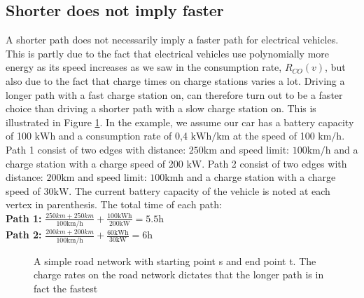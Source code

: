 \subsection{Shorter does not imply faster}
\label{sec:shorternotfaster}

A shorter path does not necessarily imply a faster path for electrical vehicles. This is partly due to the fact that electrical vehicles use polynomially more energy as its speed increases as we saw in the consumption rate, $R_{CO}(v)$, but also due to the fact that charge times on charge stations varies a lot. Driving a longer path with a fast charge station on, can therefore turn out to be a faster choice than driving a shorter path with a slow charge station on. This is illustrated in Figure \ref{fig:simpleroad-network}. In the example, we assume our car has a battery capacity of 100 $\si{\kWh}$ and a consumption rate of 0,4 $\si{\kWh\per\km}$ at the speed of 100 $\si{\km\per\hour}$.\\

Path 1 consist of two edges with distance: $ 250 \si{\km}$ and speed limit: $100 \si{\km\per\hour}$
and a charge station with a charge speed of 200 $\si{\kW}$. Path 2 consist of two edges with distance: $200 \si{\km}$ and speed limit: $100 \si{\km\hour}$ and a charge station with a charge speed of $30\si{\kW}$. The current battery capacity of the vehicle is noted at each vertex in parenthesis. The total time of each path:\\
				
\textbf{Path 1:} $\frac{250\si{km} + 250\si{km}}{100\si{\km\per\hour}} + \frac{100\si{\kWh}}{200\si{\kW}} = 5.5\si{\hour}$\\

\textbf{Path 2:} $\frac{200\si{km} + 200\si{km}}{100 \si{\km\per\hour}} + \frac{60\si{\kWh}}{30\si{\kW}} = 6\si{\hour}$

\begin{figure}
\label{fig:simpleroad-network}
\caption{A simple road network with starting point s and end point t. The charge rates on the road network dictates that the longer path is in fact the fastest}
\end{figure}